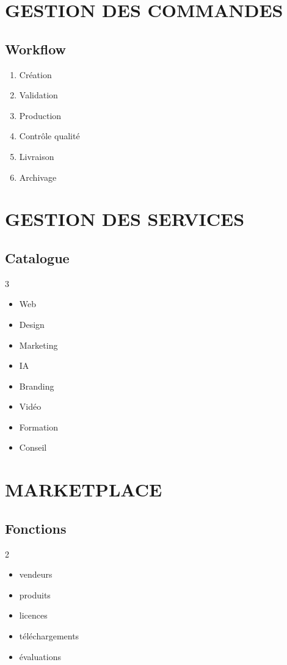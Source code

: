 \documentclass[12pt,a4paper,oneside]{book}
\begin{document}
\chapter{GESTION DES COMMANDES}

\section{Workflow}
\begin{enumerate}
\item Création
\item Validation
\item Production
\item Contrôle qualité
\item Livraison
\item Archivage
\end{enumerate}

\chapter{GESTION DES SERVICES}

\section{Catalogue}
\begin{multicols}{3}
\begin{itemize}
\item Web
\item Design
\item Marketing
\item IA
\item Branding
\item Vidéo
\item Formation
\item Conseil
\end{itemize}
\end{multicols}

\chapter{MARKETPLACE}

\section{Fonctions}
\begin{multicols}{2}
\begin{itemize}
\item vendeurs
\item produits
\item licences
\item téléchargements
\item évaluations
\end{itemize}
\end{multicols}
\end{document}
